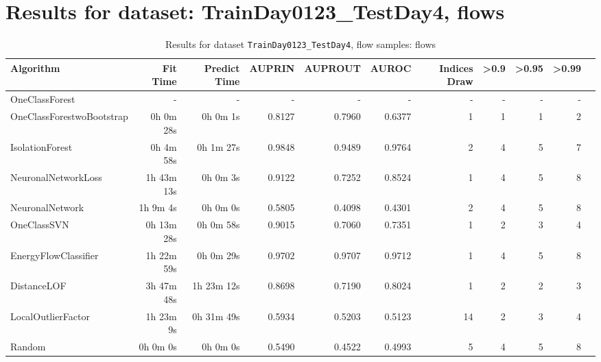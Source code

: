 \documentclass{article}
\begin{document}
\section*{Results for dataset: TrainDay0123_TestDay4, flows}
\begin{table}[h!]
\centering
\caption{Results for dataset \texttt{TrainDay0123_TestDay4}, flow samples: flows}
\label{tab:trainday0123testday4_flows}
\begin{tabular}{lrrrrrrrrrr}
\toprule
Algorithm & Fit Time & Predict Time & AUPRIN & AUPROUT & AUROC & Indices Draw & >0.9 & >0.95 & >0.99 \\
\midrule
OneClassForest & - & - & - & - & - & - & - & - & - \\
OneClassForestwoBootstrap & 0h 0m 28s & 0h 0m 1s & 0.8127 & 0.7960 & 0.6377 & 1 & 1 & 1 & 2 \\
IsolationForest & 0h 4m 58s & 0h 1m 27s & 0.9848 & 0.9489 & 0.9764 & 2 & 4 & 5 & 7 \\
NeuronalNetworkLoss & 1h 43m 13s & 0h 0m 3s & 0.9122 & 0.7252 & 0.8524 & 1 & 4 & 5 & 8 \\
NeuronalNetwork & 1h 9m 4s & 0h 0m 0s & 0.5805 & 0.4098 & 0.4301 & 2 & 4 & 5 & 8 \\
OneClassSVN & 0h 13m 28s & 0h 0m 58s & 0.9015 & 0.7060 & 0.7351 & 1 & 2 & 3 & 4 \\
EnergyFlowClassifier & 1h 22m 59s & 0h 0m 29s & 0.9702 & 0.9707 & 0.9712 & 1 & 4 & 5 & 8 \\
DistanceLOF & 3h 47m 48s & 1h 23m 12s & 0.8698 & 0.7190 & 0.8024 & 1 & 2 & 2 & 3 \\
LocalOutlierFactor & 1h 23m 9s & 0h 31m 49s & 0.5934 & 0.5203 & 0.5123 & 14 & 2 & 3 & 4 \\
Random & 0h 0m 0s & 0h 0m 0s & 0.5490 & 0.4522 & 0.4993 & 5 & 4 & 5 & 8 \\
\bottomrule
\end{tabular}
\end{table}
\end{document}
